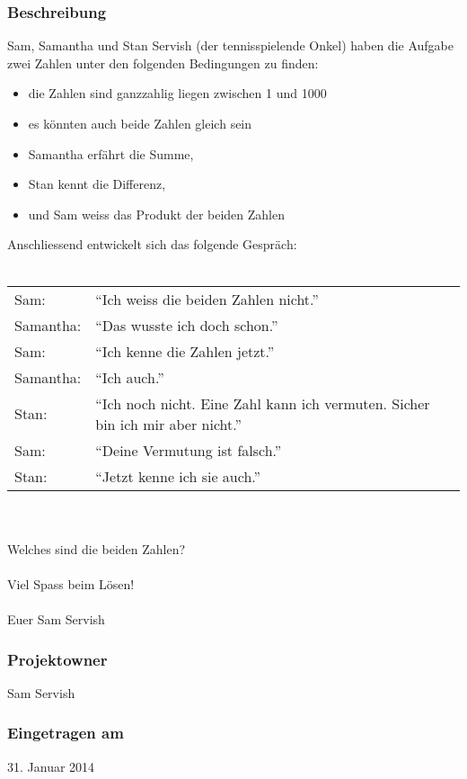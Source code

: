 \documentclass[a4paper, 10pt, fleqn]{article}
\begin{document}
\subsubsection*{Beschreibung}
Sam, Samantha und Stan Servish (der tennisspielende Onkel) haben die Aufgabe 
zwei Zahlen unter den folgenden Bedingungen zu finden:
\begin{itemize}
\item die Zahlen sind ganzzahlig liegen zwischen 1 und 1000
\item es könnten auch beide Zahlen gleich sein
\item Samantha erfährt die Summe,
\item Stan kennt die Differenz,
\item und Sam weiss das Produkt der beiden Zahlen
\end{itemize}
Anschliessend entwickelt sich das folgende Gespräch:
\\\\
\begin{tabular}{ll}
Sam:      & "`Ich weiss die beiden Zahlen nicht."' \\
Samantha: & "`Das wusste ich doch schon."' \\
Sam:      & "`Ich kenne die Zahlen jetzt."' \\
Samantha: & "`Ich auch."' \\
Stan:     & "`Ich noch nicht. Eine Zahl kann ich vermuten. Sicher bin ich mir aber nicht."' \\
Sam:      & "`Deine Vermutung ist falsch."' \\
Stan:     & "`Jetzt kenne ich sie auch."' \\
\end{tabular}
\\\\
Welches sind die beiden Zahlen?
\\\\
Viel Spass beim Lösen!
\\\\
Euer Sam Servish

\subsubsection*{Projektowner}
Sam Servish 

\subsubsection*{Eingetragen am}
31. Januar 2014 \\

\newpage
\end{document}
